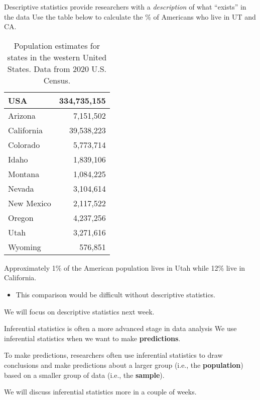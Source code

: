 \documentclass[
  ignorenonframetext,
]{beamer}
\providecommand{\tightlist}{%
  \setlength{\itemsep}{0pt}\setlength{\parskip}{0pt}}
\begin{document}
\begin{frame}{Descriptive statistics provide researchers with a
\emph{description} of what ``exists'' in the data}
\protect\hypertarget{descriptive-statistics-provide-researchers-with-a-description-of-what-exists-in-the-data}{}
Use the table below to calculate the \% of Americans who live in UT and
CA.

\begin{table}

\caption{\label{tab:unnamed-chunk-2}Population estimates for states in the western United States. Data from 2020 U.S. Census.}
\centering
\fontsize{20}{22}\selectfont
\begin{tabular}[t]{l|r}
\hline
USA & 334,735,155\\
\hline
Arizona & 7,151,502\\
\hline
California & 39,538,223\\
\hline
Colorado & 5,773,714\\
\hline
Idaho & 1,839,106\\
\hline
Montana & 1,084,225\\
\hline
Nevada & 3,104,614\\
\hline
New Mexico & 2,117,522\\
\hline
Oregon & 4,237,256\\
\hline
Utah & 3,271,616\\
\hline
Wyoming & 576,851\\
\hline
\end{tabular}
\end{table}
\end{frame}

\begin{frame}{}
\protect\hypertarget{section-9}{}
Approximately 1\% of the American population lives in Utah while 12\%
live in California.

\begin{itemize}
\tightlist
\item
  This comparison would be difficult without descriptive statistics.
\end{itemize}

We will focus on descriptive statistics next week.
\end{frame}

\begin{frame}{Inferential statistics is often a more advanced stage in
data analysis}
\protect\hypertarget{inferential-statistics-is-often-a-more-advanced-stage-in-data-analysis}{}
We use inferential statistics when we want to make \textbf{predictions}.

To make predictions, researchers often use inferential statistics to
draw conclusions and make predictions about a larger group (i.e., the
\textbf{population}) based on a smaller group of data (i.e., the
\textbf{sample}).

We will discuss inferential statistics more in a couple of weeks.
\end{frame}
\end{document}
